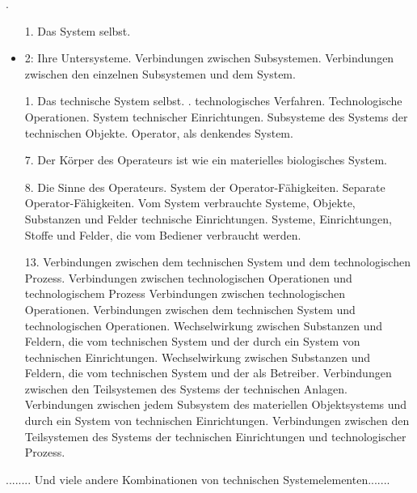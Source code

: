 \documentclass[11pt,a4paper]{article}
\begin{document}
{{.
\begin{itemize}
\item[1.] Das System selbst.
\item 2: Ihre Untersysteme.
\Position[3.] Verbindungen zwischen Subsystemen.
\Position[4.] Verbindungen zwischen den einzelnen Subsystemen und dem System.
\end{itemize}
\begin{itemize}
\item[1.] Das technische System selbst.
\2. technologisches Verfahren.
\Posten[3.] Technologische Operationen.
\Posten[4.] System technischer Einrichtungen.
\Position[5.] Subsysteme des Systems der technischen Objekte.
\Posten[6.] Operator, als denkendes System.
\item[7.] Der Körper des Operateurs ist wie ein materielles biologisches System.
\item[8.] Die Sinne des Operateurs.
\Posten[9.] System der Operator-Fähigkeiten.
\Posten[10.] Separate Operator-Fähigkeiten.
\Posten[11.] Vom System verbrauchte Systeme, Objekte, Substanzen und Felder
 technische Einrichtungen.
\Posten[12.] Systeme, Einrichtungen, Stoffe und Felder, die vom Bediener verbraucht werden.
\item[13.] Verbindungen zwischen dem technischen System und dem technologischen Prozess.
\Posten[14.] Verbindungen zwischen technologischen Operationen und technologischem Prozess
\Posten[15.] Verbindungen zwischen technologischen Operationen.
\Posten[16.] Verbindungen zwischen dem technischen System und technologischen Operationen.
\Posten[17.] Wechselwirkung zwischen Substanzen und Feldern, die vom technischen System und der
 durch ein System von technischen Einrichtungen.
\Posten[18.] Wechselwirkung zwischen Substanzen und Feldern, die vom technischen System und der
 als Betreiber.
\Position[19.] Verbindungen zwischen den Teilsystemen des Systems der technischen Anlagen.
\Position[20.] Verbindungen zwischen jedem Subsystem des materiellen Objektsystems und
 durch ein System von technischen Einrichtungen.
\Position[21.] Verbindungen zwischen den Teilsystemen des Systems der technischen Einrichtungen und
 technologischer Prozess.
\end{itemize}
........ Und viele andere Kombinationen von technischen Systemelementen.......

}}
\end{document}
